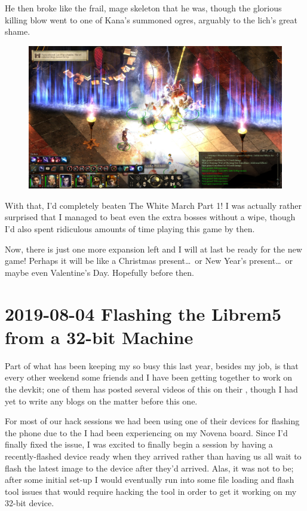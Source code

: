 \documentclass{article}
\begin{document}
He then broke like the frail, mage skeleton that he was, though the glorious killing blow went to one of Kana's summoned ogres, arguably to the lich's great shame.

\begin{figure}
\includegraphics[scale=0.33]{files/blog/2019_08_17_poe_potd_wmpt1/2019_08_17_concelhaut_7.jpg}
\end{figure}

With that, I'd completely beaten The White March Part 1!  I was actually rather surprised that I managed to beat even the extra bosses without a wipe, though I'd also spent ridiculous amounts of time playing this game by then.

Now, there is just one more expansion left and I will at last be ready for the new game!  Perhaps it will be like a Christmas present\ldots~or New Year's present\ldots~or maybe even Valentine's Day.  Hopefully before then.


\section{2019-08-04 Flashing the Librem5 from a 32-bit Machine}
Part of what has been keeping my so busy this last year, besides my job, is that every other weekend some friends and I have been getting together to work on the  devkit; one of them has posted several videos of this on their , though I had yet to write any blogs on the matter before this one.

For most of our hack sessions we had been using one of their devices for flashing the phone due to the  I had been experiencing on my Novena board.  Since I'd finally fixed the issue, I was excited to finally begin a session by having a recently-flashed device ready when they arrived rather than having us all wait to flash the latest image to the device after they'd arrived.  Alas, it was not to be; after some initial set-up I would eventually run into some file loading and flash tool issues that would require hacking the tool in order to get it working on my 32-bit device.
\end{document}

